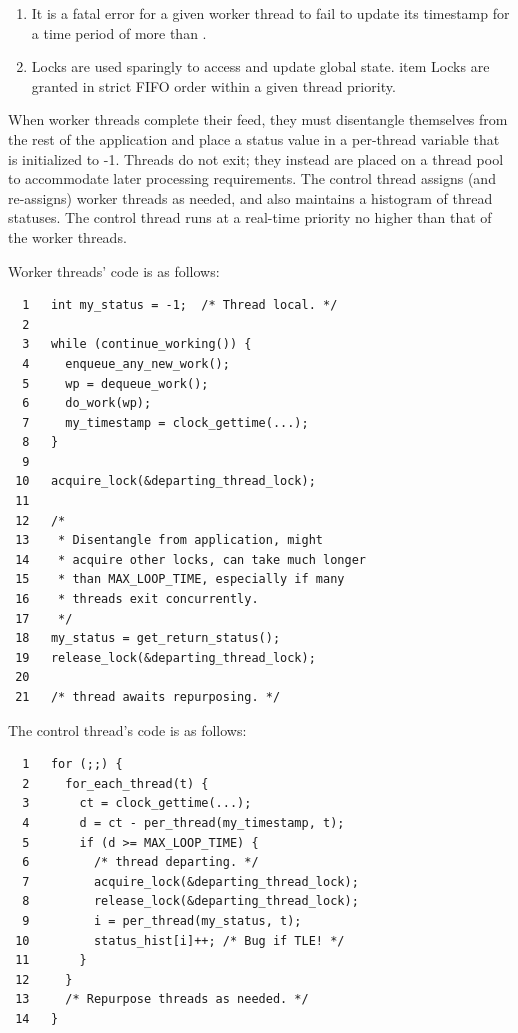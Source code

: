 \begin{enumerate}
	\begin{enumerate}
	\item	It is a fatal error for a given worker thread to fail
		to update its timestamp for a time period of more than
		.
	\item	Locks are used sparingly to access and update global
		state.
	item	Locks are granted in strict FIFO order within
		a given thread priority.
	\end{enumerate}

	When worker threads complete their feed, they must disentangle
	themselves from the rest of the application and place a status
	value in a per-thread  variable that is initialized
	to -1.
	Threads do not exit; they instead are placed on a thread pool
	to accommodate later processing requirements.
	The control thread assigns (and re-assigns) worker threads as
	needed, and also maintains a histogram of thread statuses.
	The control thread runs at a real-time priority no higher than
	that of the worker threads.

	Worker threads' code is as follows:

	\vspace{5pt}
	\begin{minipage}[t]{\columnwidth}
	\scriptsize
\begin{verbatim}
  1   int my_status = -1;  /* Thread local. */
  2 
  3   while (continue_working()) {
  4     enqueue_any_new_work();
  5     wp = dequeue_work();
  6     do_work(wp);
  7     my_timestamp = clock_gettime(...);
  8   }
  9 
 10   acquire_lock(&departing_thread_lock);
 11 
 12   /*
 13    * Disentangle from application, might
 14    * acquire other locks, can take much longer
 15    * than MAX_LOOP_TIME, especially if many
 16    * threads exit concurrently.
 17    */
 18   my_status = get_return_status();
 19   release_lock(&departing_thread_lock);
 20 
 21   /* thread awaits repurposing. */
\end{verbatim}
	\end{minipage}
	\vspace{5pt}

	The control thread's code is as follows:

	\vspace{5pt}
	\begin{minipage}[t]{\columnwidth}
	\scriptsize
\begin{verbatim}
  1   for (;;) {
  2     for_each_thread(t) {
  3       ct = clock_gettime(...);
  4       d = ct - per_thread(my_timestamp, t);
  5       if (d >= MAX_LOOP_TIME) {
  6         /* thread departing. */
  7         acquire_lock(&departing_thread_lock);
  8         release_lock(&departing_thread_lock);
  9         i = per_thread(my_status, t);
 10         status_hist[i]++; /* Bug if TLE! */
 11       }
 12     }
 13     /* Repurpose threads as needed. */
 14   }
\end{verbatim}
	\end{minipage}
	\vspace{5pt}


\end{enumerate}
